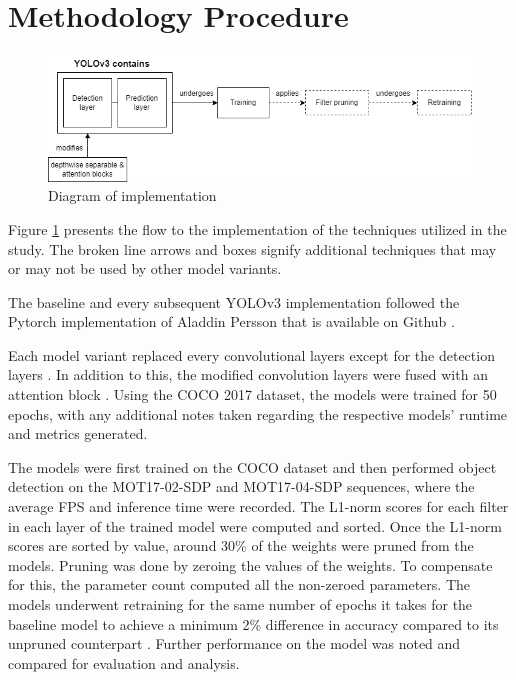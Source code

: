 \section{Methodology Procedure}

\begin{figure}[!htbp]
    \centering
    \centerline{\includegraphics[width=0.95\linewidth]{images/Diagram.png}}
    \caption{Diagram of implementation}
    \label{fig:diagram}
\end{figure}

Figure \ref{fig:diagram} presents the flow to the implementation of the techniques utilized in the study. The broken line arrows and boxes signify additional techniques that may or may not be used by other model variants.

The baseline and every subsequent YOLOv3 implementation followed the Pytorch implementation of Aladdin Persson that is available on Github \cite{MachineLearningCollectionMLPytorch}. 

Each model variant replaced every convolutional layers except for the detection layers \cite{chakarDepthwiseSeparableConvolutions2020}. In addition to this, the modified convolution layers were fused with an attention block \cite{sunYoloBasedLightweightObject2023}. Using the COCO 2017 dataset, the models were trained for 50 epochs, with any additional notes taken regarding the respective models' runtime and metrics generated.

The models were first trained on the COCO dataset and then performed object detection on the MOT17-02-SDP and MOT17-04-SDP sequences, where the average FPS and inference time were recorded. The L1-norm scores for each filter in each layer of the trained model were computed and sorted. Once the L1-norm scores are sorted by value, around 30\% of the weights were pruned from the models. Pruning was done by zeroing the values of the weights. To compensate for this, the parameter count computed all the non-zeroed parameters. The models underwent retraining for the same number of epochs it takes for the baseline model to achieve a minimum 2\% difference in accuracy compared to its unpruned counterpart \cite{liPruningFiltersEfficient2017}. Further performance on the model was noted and compared for evaluation and analysis. 

